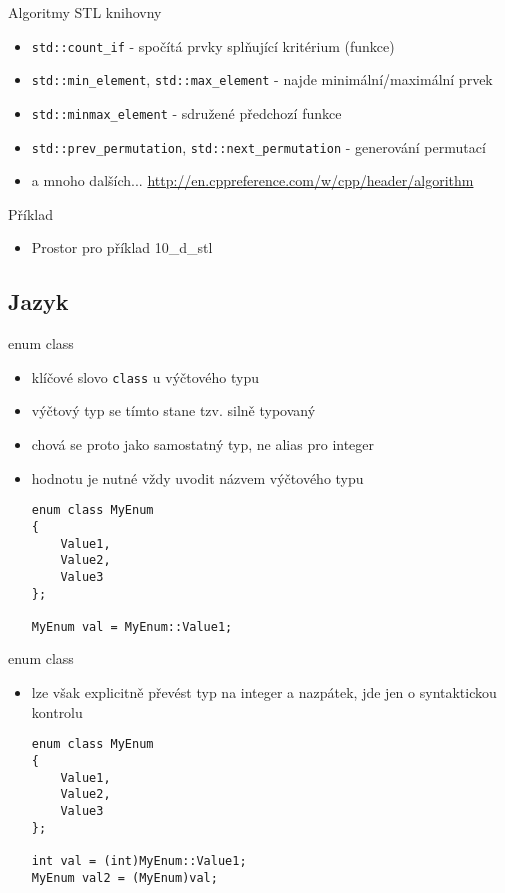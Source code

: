 \documentclass{beamer}
\begin{document}
\begin{xframe}{Algoritmy STL knihovny}
	\begin{itemize}
		\item \texttt{std::count\_if} - spočítá prvky splňující kritérium (funkce)
		\item \texttt{std::min\_element}, \texttt{std::max\_element} - najde minimální/maximální prvek
		\item \texttt{std::minmax\_element} - sdružené předchozí funkce
		\item \texttt{std::prev\_permutation}, \texttt{std::next\_permutation} - generování permutací
		\item a mnoho dalších... \url{http://en.cppreference.com/w/cpp/header/algorithm}
	\end{itemize}
\end{xframe}

\begin{xframe}{Příklad}
	\begin{itemize}
		\item Prostor pro příklad 10\_d\_stl
	\end{itemize}
\end{xframe}

\subsection{Jazyk}

\begin{xframe}{enum class}
	\begin{itemize}
		\item klíčové slovo \texttt{class} u výčtového typu
		\item výčtový typ se tímto stane tzv. silně typovaný
		\item chová se proto jako samostatný typ, ne alias pro integer
		\item hodnotu je nutné vždy uvodit názvem výčtového typu
\begin{lstlisting}[basicstyle=\fontsize{8}{9}\selectfont\ttfamily]
enum class MyEnum
{
    Value1,
    Value2,
    Value3
};

MyEnum val = MyEnum::Value1;
\end{lstlisting}
	\end{itemize}
\end{xframe}

\begin{xframe}{enum class}
	\begin{itemize}
		\item lze však explicitně převést typ na integer a nazpátek, jde jen o syntaktickou kontrolu
\begin{lstlisting}[basicstyle=\fontsize{8}{9}\selectfont\ttfamily]
enum class MyEnum
{
    Value1,
    Value2,
    Value3
};

int val = (int)MyEnum::Value1;
MyEnum val2 = (MyEnum)val;
\end{lstlisting}
	\end{itemize}
\end{xframe}
\end{document}
